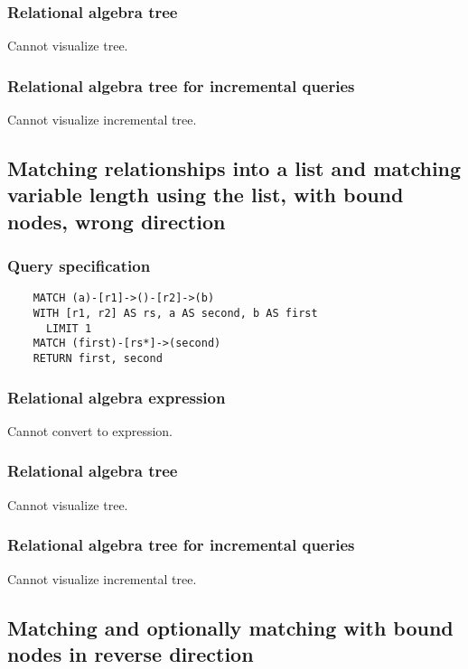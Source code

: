 	\subsubsection*{Relational algebra tree}

	Cannot visualize tree.

	\subsubsection*{Relational algebra tree for incremental queries}

	Cannot visualize incremental tree.
	\subsection{Matching relationships into a list and matching variable length using the list, with bound nodes, wrong direction}

	\subsubsection*{Query specification}

	\begin{lstlisting}
	MATCH (a)-[r1]->()-[r2]->(b)
	WITH [r1, r2] AS rs, a AS second, b AS first
	  LIMIT 1
	MATCH (first)-[rs*]->(second)
	RETURN first, second
	\end{lstlisting}


	\subsubsection*{Relational algebra expression}

	Cannot convert to expression.

	\subsubsection*{Relational algebra tree}

	Cannot visualize tree.

	\subsubsection*{Relational algebra tree for incremental queries}

	Cannot visualize incremental tree.
	\subsection{Matching and optionally matching with bound nodes in reverse direction}

